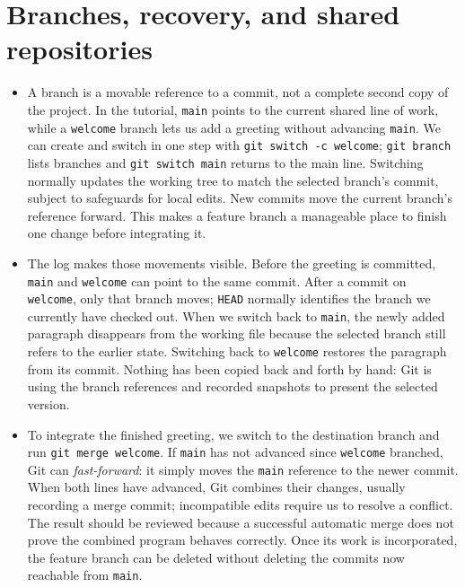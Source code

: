 \documentclass[10pt]{article}
\begin{document}
\section*{Branches, recovery, and shared repositories}

\begin{itemize}[leftmargin=1.25em, itemsep=0.3em, parsep=0pt, topsep=0pt]
    \item A branch is a movable reference to a commit, not a complete second copy of the project. In the tutorial, \texttt{main} points to the current shared line of work, while a \texttt{welcome} branch lets us add a greeting without advancing \texttt{main}. We can create and switch in one step with \texttt{git switch -c welcome}; \texttt{git branch} lists branches and \texttt{git switch main} returns to the main line. Switching normally updates the working tree to match the selected branch's commit, subject to safeguards for local edits. New commits move the current branch's reference forward. This makes a feature branch a manageable place to finish one change before integrating it.

    \item The log makes those movements visible. Before the greeting is committed, \texttt{main} and \texttt{welcome} can point to the same commit. After a commit on \texttt{welcome}, only that branch moves; \texttt{HEAD} normally identifies the branch we currently have checked out. When we switch back to \texttt{main}, the newly added paragraph disappears from the working file because the selected branch still refers to the earlier state. Switching back to \texttt{welcome} restores the paragraph from its commit. Nothing has been copied back and forth by hand: Git is using the branch references and recorded snapshots to present the selected version.

    \item To integrate the finished greeting, we switch to the destination branch and run \texttt{git merge welcome}. If \texttt{main} has not advanced since \texttt{welcome} branched, Git can \emph{fast-forward}: it simply moves the \texttt{main} reference to the newer commit. When both lines have advanced, Git combines their changes, usually recording a merge commit; incompatible edits require us to resolve a conflict. The result should be reviewed because a successful automatic merge does not prove the combined program behaves correctly. Once its work is incorporated, the feature branch can be deleted without deleting the commits now reachable from \texttt{main}.


\end{itemize}
\end{document}
